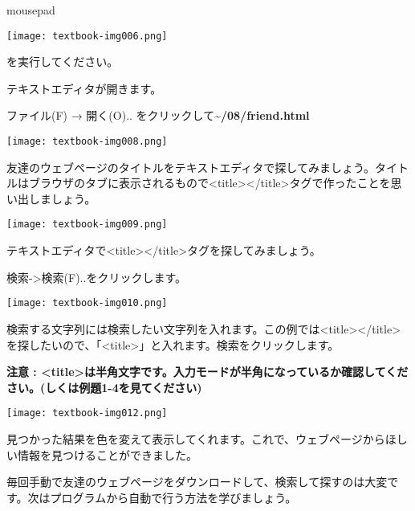 mousepad



\begin{center}
\texttt{[image: textbook-img006.png]}

\end{center}
を実行してください。

テキストエディタが開きます。

ファイル(F) → 開く(O).. をクリックして\textbf{{\textasciitilde}/08/friend.html}

\begin{center}
  \texttt{[image: textbook-img008.png]}
\end{center}

\clearpage
友達のウェブページのタイトルをテキストエディタで探してみましょう。タイトルはブラウザのタブに表示されるもので{\textless}title{\textgreater}{\textless}/title{\textgreater}タグで作ったことを思い出しましょう。

\begin{center}
  \texttt{[image: textbook-img009.png]}
\end{center}

テキストエディタで{\textless}title{\textgreater}{\textless}/title{\textgreater}タグを探してみましょう。

検索-{\textgreater}検索(F)..をクリックします。

\begin{center}
  \texttt{[image: textbook-img010.png]}
\end{center}

\clearpage
検索する文字列には検索したい文字列を入れます。この例では{\textless}title{\textgreater}{\textless}/title{\textgreater}を探したいので、「{\textless}title{\textgreater}」と入れます。検索をクリックします。

{\bfseries
注意 :
{\textless}title{\textgreater}は半角文字です。入力モードが半角になっているか確認してください。(しくは例題1-4を見てください)}

\begin{center}
  \texttt{[image: textbook-img012.png]}
\end{center}
見つかった結果を色を変えて表示してくれます。これで、ウェブページからほしい情報を見つけることができました。

毎回手動で友達のウェブページをダウンロードして、検索して探すのは大変です。次はプログラムから自動で行う方法を学びましょう。

